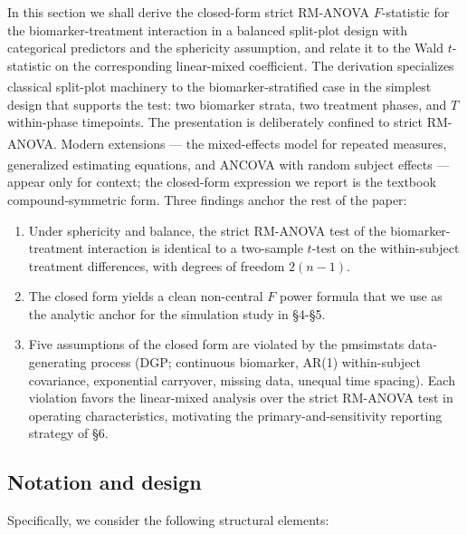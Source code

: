 \documentclass[
  11pt,
]{article}
\providecommand{\tightlist}{%
  \setlength{\itemsep}{0pt}\setlength{\parskip}{0pt}}
\begin{document}
In this section we shall derive the closed-form strict RM-ANOVA
\(F\)-statistic for the biomarker-treatment interaction in a
balanced split-plot design with categorical predictors and the
sphericity assumption, and relate it to the Wald \(t\)-statistic
on the corresponding linear-mixed coefficient. The derivation
specializes classical split-plot machinery\textsuperscript{}
to the biomarker-stratified case in the simplest design that
supports the test: two biomarker strata, two treatment phases,
and \(T\) within-phase timepoints. The presentation is deliberately
confined to strict RM-ANOVA. Modern extensions --- the
mixed-effects model for repeated measures\textsuperscript{}, generalized estimating
equations\textsuperscript{}, and ANCOVA with random subject effects ---
appear only for context; the closed-form expression we report is
the textbook compound-symmetric form. Three findings anchor the
rest of the paper:

\begin{enumerate}
\def\labelenumi{\arabic{enumi}.}
\tightlist
\item
  Under sphericity and balance, the strict RM-ANOVA test of
  the biomarker-treatment interaction is identical to a
  two-sample \(t\)-test on the within-subject treatment
  differences, with degrees of freedom \(2(n-1)\).
\item
  The closed form yields a clean non-central \(F\) power formula
  that we use as the analytic anchor for the simulation study
  in §4-§5.
\item
  Five assumptions of the closed form are violated by the
  pmsimstats data-generating process (DGP; continuous biomarker,
  AR(1) within-subject covariance, exponential carryover,
  missing data, unequal time spacing). Each violation
  favors the linear-mixed analysis over the strict RM-ANOVA
  test in operating characteristics, motivating the
  primary-and-sensitivity reporting strategy of §6.
\end{enumerate}

\subsection{Notation and design}\label{notation-and-design}

Specifically, we consider the following structural elements:
\end{document}
